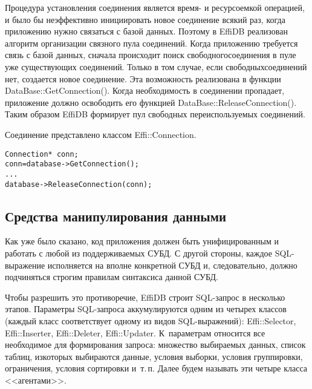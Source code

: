 \begin{multicols}{2}
Процедура установления соединения является время- и ресурсоемкой операцией, и было 
бы\linebreak
неэффективно инициировать новое соединение всякий раз, когда приложению нужно 
связаться\linebreak
с базой данных. Поэтому в EffiDB реализован\linebreak
алгоритм организации связного 
пула соединений. Когда приложению требуется связь с базой\linebreak
 данных, сначала происходит 
поиск свободного\linebreak соединения в пуле уже существующих соединений. Только в том 
случае, если свободных\linebreak соединений нет, создается новое соединение. Эта возможность 
реализована в функции {\sf DataBase::\linebreak GetConnection()}. Когда необходимость в соединении 
пропадает, приложение должно освободить его функцией {\sf DataBase::ReleaseConnection()}. 
Таким образом \mbox{EffiDB} формирует пул свободных переиспользуемых соединений.

Соединение представлено классом {\sf Effi::\linebreak Connection}. 
\begin{verbatim}
Connection* conn;
conn=database->GetConnection();
...
database->ReleaseConnection(conn);
\end{verbatim}

\subsection{Средства манипулирования данными} %

Как уже было сказано, код приложения должен быть унифицированным и работать с 
любой из поддерживаемых СУБД. С другой стороны, каждое SQL-вы\-ра\-же\-ние 
исполняется на вполне конкретной СУБД и, следовательно, должно подчиняться строгим 
правилам синтаксиса данной СУБД.

Чтобы разрешить это противоречие, EffiDB строит SQL-запрос в несколько этапов. 
Па\-ра\-мет\-ры SQL-за\-про\-са аккумулируются одним из четырех классов (каждый класс 
соответствует одному из видов SQL-вы\-ра\-же\-ний): 
{\sf Effi::Selector}, {\sf Effi::Inserter}, 
{\sf Effi::Deleter}, {\sf Effi::Updater}. 
К~параметрам относится\linebreak
 все необходимое для формирования 
запроса: множество выбираемых данных, список таблиц, из\linebreak которых выбираются данные, 
условия выборки, условия группировки, ограничения, условия сортировки и~т.\,п. Далее 
будем называть эти четыре класса <<агентами>>.


\end{multicols}
